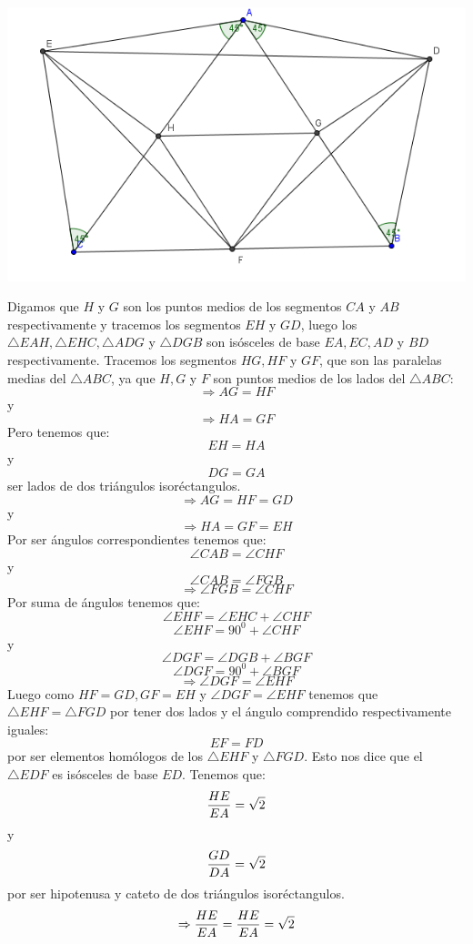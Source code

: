 \documentclass{book}
\begin{document}
\begin{enumerate}
\begin{center}
              \includegraphics[scale=1]{imagenes/Geometria/20.png}
          \end{center}
          Digamos que $H$ y $G$  son los puntos medios de los segmentos $CA$ y $AB$ respectivamente y tracemos los segmentos $EH$ y $GD$, luego los $\triangle EAH,\triangle EHC,\triangle ADG$ y $\triangle DGB$ son isósceles de base $EA,EC,AD$ y $BD$ respectivamente.
          Tracemos los segmentos $HG,HF$ y $GF$, que son las paralelas medias del $\triangle ABC$, ya que $H,G$ y $F$ son puntos medios de los lados del $\triangle ABC$:
          $$\Rightarrow AG=HF$$
          y
          $$\Rightarrow HA=GF$$
          Pero tenemos que:
          $$EH=HA$$
          y
          $$DG=GA$$
          ser lados de dos triángulos isoréctangulos.
          $$\Rightarrow AG=HF=GD$$
          y
          $$\Rightarrow HA=GF=EH$$
          Por ser ángulos correspondientes tenemos que:
          $$\angle CAB=\angle CHF$$
          y
          $$\angle CAB=\angle FGB$$
          $$\Rightarrow\angle FGB=\angle CHF$$
          Por suma de ángulos tenemos que:
          $$\angle EHF=\angle EHC+\angle CHF$$
          $$\angle EHF=90^0+\angle CHF$$
          y
          $$\angle DGF=\angle DGB+\angle BGF$$
          $$\angle DGF=90^0+\angle BGF$$
          $$\Rightarrow\angle DGF=\angle EHF$$
          Luego como $HF=GD,GF=EH$ y $\angle DGF=\angle EHF$ tenemos que $\triangle EHF=\triangle FGD$ por tener dos lados y el ángulo comprendido respectivamente iguales:
          $$EF=FD$$
          por ser elementos homólogos de los $\triangle EHF$ y $\triangle FGD$. Esto nos dice que el $\triangle EDF$ es isósceles de base $ED$.
          Tenemos que:
          $${HE\over EA}=\sqrt{2}$$
          y
          $${GD\over DA}=\sqrt{2}$$
          por ser hipotenusa y cateto de dos triángulos isoréctangulos.
          $$\Rightarrow{HE\over EA}={HE\over EA}=\sqrt{2}$$

\end{enumerate}
\end{document}
